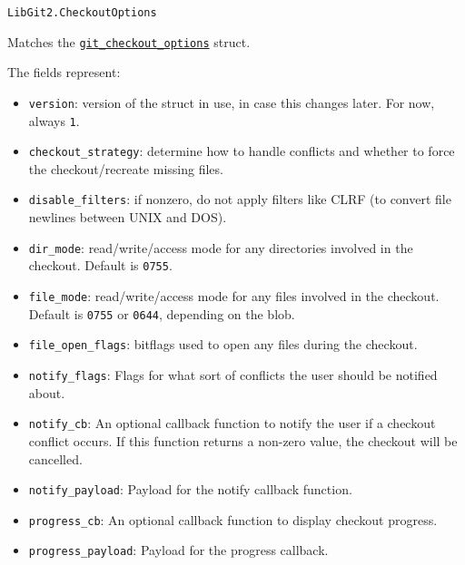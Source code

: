 \begin{adjustwidth}{2em}{0pt}


\begin{verbatim}
LibGit2.CheckoutOptions
\end{verbatim}

Matches the \href{https://libgit2.org/libgit2/\#HEAD/type/git\_checkout\_options}{\texttt{git\_checkout\_options}} struct.

The fields represent:

\begin{itemize}
\item \texttt{version}: version of the struct in use, in case this changes later. For now, always \texttt{1}.


\item \texttt{checkout\_strategy}: determine how to handle conflicts and whether to force the  checkout/recreate missing files.


\item \texttt{disable\_filters}: if nonzero, do not apply filters like CLRF (to convert file newlines between UNIX and DOS).


\item \texttt{dir\_mode}: read/write/access mode for any directories involved in the checkout. Default is \texttt{0755}.


\item \texttt{file\_mode}: read/write/access mode for any files involved in the checkout.  Default is \texttt{0755} or \texttt{0644}, depending on the blob.


\item \texttt{file\_open\_flags}: bitflags used to open any files during the checkout.


\item \texttt{notify\_flags}: Flags for what sort of conflicts the user should be notified about.


\item \texttt{notify\_cb}: An optional callback function to notify the user if a checkout conflict occurs.  If this function returns a non-zero value, the checkout will be cancelled.


\item \texttt{notify\_payload}: Payload for the notify callback function.


\item \texttt{progress\_cb}: An optional callback function to display checkout progress.


\item \texttt{progress\_payload}: Payload for the progress callback.



\end{itemize}
\end{adjustwidth}
